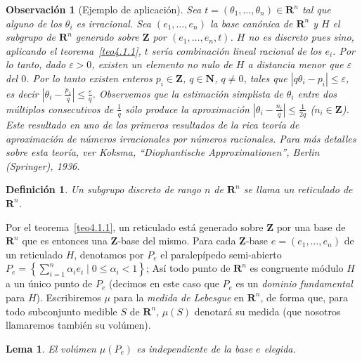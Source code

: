 \documentclass[10pt,oneside,bibtotoc,smallheadings,leqno,a5paper,DIV=12]{scrbook}
\newcommand{\RR}{\mathbf{R}}
\newcommand{\ZZ}{\mathbf{Z}}
\newcommand{\NN}{\mathbf{N}}
\newcommand{\abs}[1]{\left\lvert#1\right\rvert}
\numberwithin{equation}{section}
\theoremstyle{defi}
\newtheorem{definition}{Definici\'on}
\theoremstyle{enonce}
\newtheorem{lemma}{Lema}
\theoremstyle{rem}
\newtheorem*{remark*}{Observaci\'on}
\numberwithin{theorem}{section}
\numberwithin{proposition}{section}
\numberwithin{definition}{section}
\numberwithin{lemma}{section}
\numberwithin{corollary}{section}
\numberwithin{example}{section}
\numberwithin{footnote}{section}%
\begin{document}
\begin{remark*}[Ejemplo de aplicaci\'on]
Sea $t = (\theta_{1},\dots,\theta_{n})\in\RR^{n}$ tal que alguno de
los $\theta_{i}$ es {\em irracional.} Sea $(e_{1},\dots,e_{n})$ la base can\'onica
de $\RR^{n}$ y $H$
el subgrupo de $\RR^{n}$ generado sobre $\ZZ$ por $(e_{1},\dots,e_{n},t)$. $H$ no es
discreto pues sino,
aplicando el teorema~\ref{teo4.1.1}, $t$ ser\'ia combinaci\'on lineal racional de
los $e_{i}$. Por lo tanto, dado
$\varepsilon > 0$, existen un elemento no nulo de $H$ a distancia menor que $\varepsilon$
del $0$. Por
lo tanto existen enteros $p_{i}\in\ZZ$, $q\in\NN$, $q\neq 0$, tales que
$\abs{q\theta_{i}-p_{i}}\leq\varepsilon$,
es decir $\abs{\theta_{i}-\frac{p_{1}}{q}}\leq\frac{\varepsilon}{q}$. Observemos que
la estimaci\'on simplista de $\theta_{i}$ entre dos m\'ultiplos consecutivos de
$\frac{1}{q}$ s\'olo
produce la aproximaci\'on $\abs{\theta_{i}-\frac{n_{i}}{q}}\leq\frac{1}{2q}$ ($n_{i}\in\ZZ$).
Este resultado en uno de los primeros resultados de la rica teor\'ia de aproximaci\'on de
n\'umeros
irracionales por n\'umeros racionales. Para m\'as detalles sobre esta teor\'ia, ver
Koksma, ``Diophantische Approximationen'', Berlin (Springer), 1936.
\end{remark*}

\begin{definition}
Un subgrupo discreto de rango $n$ de $\RR^{n}$ se llama un reticulado de $\RR^{n}$.
\end{definition}

Por el teorema~\ref{teo4.1.1}, un reticulado est\'a generado sobre $\ZZ$ por una base
de $\RR^{n}$ que es entonces
una $\ZZ$-base del mismo. Para cada $\ZZ$-base $e = (e_{1},\dots,e_{n})$ de un
reticulado $H$, denotamos
por $P_{e}$ el paralep\'ipedo semi-abierto
$P_{e} = \left\{\sum_{i=1}^{n}\alpha_{i}e_{i}\mid 0\leq \alpha_{i}<1\right\}$;
As\'i todo punto de $\RR^{n}$ es congruente m\'odulo $H$ a un \'unico punto de $P_{e}$
(decimos en este
caso que $P_{e}$ es un {\em dominio fundamental} para $H$). Escribiremos $\mu$ para
la {\em medida de
Lebesgue} en $\RR^{n}$, de forma que, para todo subconjunto medible $S$ de $\RR^{n}$,
$\mu(S)$ denotar\'a
su medida (que nosotros llamaremos tambi\'en su vol\'umen).

\begin{lemma}
El vol\'umen $\mu(P_{e})$ es independiente de la base $e$ elegida.
\end{lemma}
\end{document}
